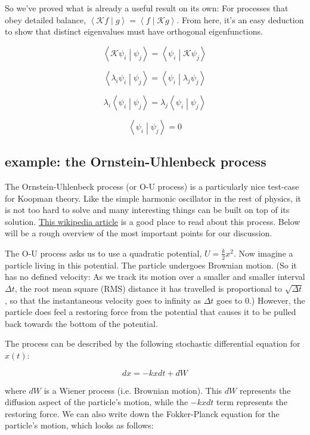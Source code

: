 \documentclass[]{article}
\newcommand{\braket}[2]{\left\langle #1 \middle| #2 \right\rangle}
\newcommand{\Kp}{\mathcal{K}}
\begin{document}
So we've proved what is already a useful result on its own: For processes that obey detailed balance, $\braket{\Kp f}{g} = \braket{f}{\Kp g}$. From here, it's an easy deduction to show that distinct eigenvalues must have orthogonal eigenfunctions.

$$
\braket{\Kp \psi_i}{\psi_j}
= \braket{\psi_i}{\Kp\psi_j}
$$

$$
\braket{\lambda_i \psi_i}{\psi_j}
= \braket{\psi_i}{\lambda_j\psi_j}
$$

$$
\lambda_i \braket{\psi_i}{\psi_j} = \lambda_j \braket{\psi_i}{\psi_j}
$$

$$
\braket{\psi_i}{\psi_j} = 0
$$







\subsection{example: the Ornstein-Uhlenbeck process}

The Ornstein-Uhlenbeck process (or O-U process) is a particularly nice test-case for Koopman theory. Like the simple harmonic oscillator in the rest of physics, it is not too hard to solve and many interesting things can be built on top of its solution. \href{https://en.wikipedia.org/wiki/Ornstein%E2%80%93Uhlenbeck_process}{This wikipedia article} is a good place to read about this process. Below will be a rough overview of the most important points for our discussion.

The O-U process asks us to use a quadratic potential, $U = \frac{k}{2}x^2$. Now imagine a particle living in this potential. The particle undergoes Brownian motion. (So it has no defined velocity: As we track its motion over a smaller and smaller interval $\Delta t$, the root mean square (RMS) distance it has travelled is proportional to $\sqrt{\Delta t}$, so that the instantaneous velocity goes to infinity as $\Delta t$ goes to 0.) However, the particle does feel a restoring force from the potential that causes it to be pulled back towards the bottom of the potential.

The process can be described by the following stochastic differential equation for $x(t)$:

$$
dx = -kx dt + dW
$$

where $dW$ is a Wiener process (i.e. Brownian motion). This $dW$ represents the diffusion aspect of the particle's motion, while the $-kxdt$ term represents the restoring force. We can also write down the Fokker-Planck equation for the particle's motion, which looks as follows:
\end{document}
